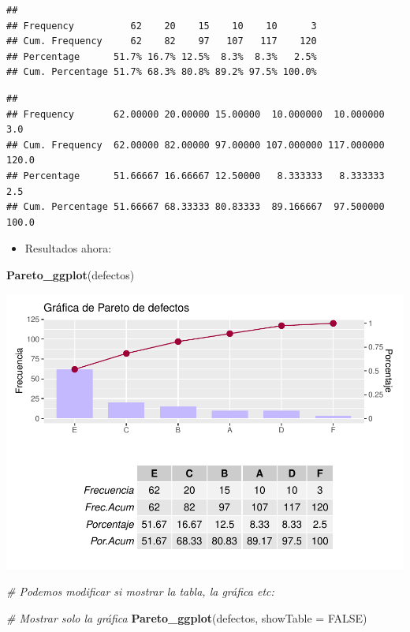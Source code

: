 \documentclass[
]{book}
\newenvironment{Shaded}{\begin{snugshade}}{\end{snugshade}}
\newcommand{\AttributeTok}[1]{\textcolor[rgb]{0.13,0.29,0.53}{#1}}
\newcommand{\CommentTok}[1]{\textcolor[rgb]{0.56,0.35,0.01}{\textit{#1}}}
\newcommand{\ConstantTok}[1]{\textcolor[rgb]{0.56,0.35,0.01}{#1}}
\newcommand{\FunctionTok}[1]{\textcolor[rgb]{0.13,0.29,0.53}{\textbf{#1}}}
\newcommand{\NormalTok}[1]{#1}
\providecommand{\tightlist}{%
  \setlength{\itemsep}{0pt}\setlength{\parskip}{0pt}}
\begin{document}
\begin{verbatim}
##                                                     
## Frequency          62    20    15    10    10      3
## Cum. Frequency     62    82    97   107   117    120
## Percentage      51.7% 16.7% 12.5%  8.3%  8.3%   2.5%
## Cum. Percentage 51.7% 68.3% 80.8% 89.2% 97.5% 100.0%
\end{verbatim}

\begin{verbatim}
##                                                                       
## Frequency       62.00000 20.00000 15.00000  10.000000  10.000000   3.0
## Cum. Frequency  62.00000 82.00000 97.00000 107.000000 117.000000 120.0
## Percentage      51.66667 16.66667 12.50000   8.333333   8.333333   2.5
## Cum. Percentage 51.66667 68.33333 80.83333  89.166667  97.500000 100.0
\end{verbatim}

\begin{itemize}
\tightlist
\item
  Resultados ahora:
\end{itemize}

\begin{Shaded}
\begin{Highlighting}[]
\FunctionTok{Pareto\_ggplot}\NormalTok{(defectos)}
\end{Highlighting}
\end{Shaded}

\includegraphics{Libro_TidyQualityTools_files/figure-latex/unnamed-chunk-138-1.pdf}

\begin{Shaded}
\begin{Highlighting}[]
\CommentTok{\# Podemos modificar si mostrar la tabla, la gráfica etc:}

\CommentTok{\# Mostrar solo la gráfica}
\FunctionTok{Pareto\_ggplot}\NormalTok{(defectos, }\AttributeTok{showTable =} \ConstantTok{FALSE}\NormalTok{)}
\end{Highlighting}
\end{Shaded}
\end{document}
